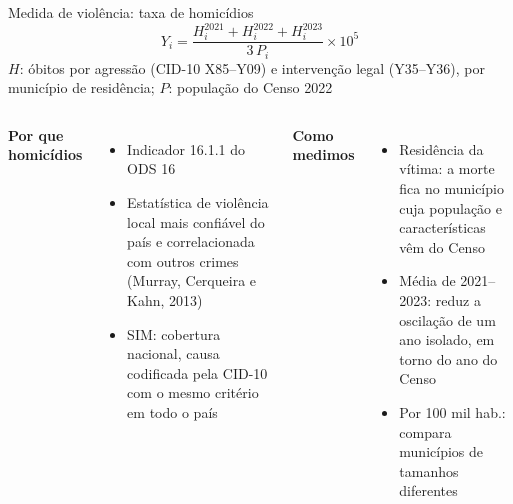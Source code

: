 \documentclass[aspectratio=169,11pt,xcolor=table]{beamer}
\begin{document}
\begin{frame}{Medida de violência: taxa de homicídios}
\[
Y_i = \frac{H_i^{2021} + H_i^{2022} + H_i^{2023}}{3\,P_i} \times 10^5
\]
{\scriptsize\color{black!70}$H$: óbitos por agressão (CID-10 X85--Y09) e intervenção legal (Y35--Y36), por município de residência; $P$: população do Censo 2022}
\vspace{0.6em}

\begin{columns}[T]
\textbf{\color{navy}Por que homicídios}
\begin{itemize}\small
\item Indicador 16.1.1 do ODS 16
\item Estatística de violência local mais confiável do país e correlacionada com outros crimes (Murray, Cerqueira e Kahn, 2013)
\item SIM: cobertura nacional, causa codificada pela CID-10 com o mesmo critério em todo o país
\end{itemize}
\textbf{\color{navy}Como medimos}
\begin{itemize}\small
\item Residência da vítima: a morte fica no município cuja população e características vêm do Censo
\item Média de 2021--2023: reduz a oscilação de um ano isolado, em torno do ano do Censo
\item Por 100 mil hab.: compara municípios de tamanhos diferentes
\end{itemize}
\end{columns}
\end{frame}
\end{document}
